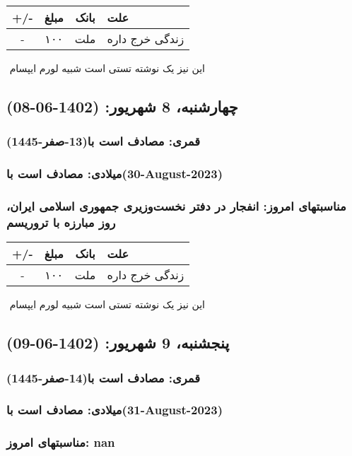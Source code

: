 \documentclass{article}
\newcommand{\rnote}[1]{\marginpar{\textcolor{color}{\StrSubstitute{\##1}{ }{\_}}}}
\newcommand{\myRow}[4]{
    #1 & #2 & #3 & #4 \\ \hline
}
\begin{document}
\begin{tabular}{ | c | c | c | p{5cm} |}
    \hline
    \myRow{ +/- }{مبلغ}{بانک}{علت}
    \myRow{-}{۱۰۰}{ملت}{زندگی خرج داره}
\end{tabular}
\newline
\newline

‌
\rnote{تست}
این نیز یک نوشته تستی است شبیه لورم ایپسام




\newpage
{}
\textcolor{color}{
\section{ چهارشنبه، 8 شهریور: (1402-06-08) }
\subsubsection*{قمری: مصادف است با(13-صفر-1445)} 
\subsubsection*{میلادی: مصادف است با(30-August-2023)}
\subsubsection*{مناسبتهای امروز: انفجار در دفتر نخست‌وزیری جمهوری اسلامی ایران، روز مبارزه با تروریسم}
}


\begin{tabular}{ | c | c | c | p{5cm} |}
    \hline
    \myRow{ +/- }{مبلغ}{بانک}{علت}
    \myRow{-}{۱۰۰}{ملت}{زندگی خرج داره}
\end{tabular}
\newline
\newline

‌
\rnote{تست}
این نیز یک نوشته تستی است شبیه لورم ایپسام




\newpage
{}
\textcolor{color}{
\section{ پنجشنبه، 9 شهریور: (1402-06-09) }
\subsubsection*{قمری: مصادف است با(14-صفر-1445)} 
\subsubsection*{میلادی: مصادف است با(31-August-2023)}
\subsubsection*{مناسبتهای امروز: nan}
}
\end{document}
